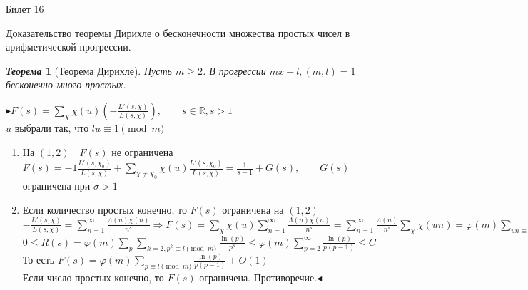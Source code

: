 \documentclass[a4paper,12pt]{article}
\newtheorem{teo}{\textit{Теорема}}
\newcommand{\ee}{\equiv}
\newcommand{\FI}{\varphi}
\newcommand{\q}{\quad}
\newcommand{\pb}{\blacktriangleright}
\newcommand{\pe}{\blacktriangleleft}
\newcommand{\Ra}{\Rightarrow}
\newcommand{\bb}[1]{\mathbb{#1}}
\newcommand{\SL}{\sum\limits}
\newcommand{\os}{\left(}
\newcommand{\cs}{\right)}
\begin{document}
\newpage
\begin{mybox2}{\hypertarget{bil16}{Билет 16}}

\begin{formbox}{}
Доказательство теоремы Дирихле о бесконечности множества простых чисел в арифметической прогрессии.
\end{formbox}
\begin{formbox}{}
\begin{teo}[Теорема Дирихле] Пусть $m\ge 2$. В прогрессии $mx+l, (m,l) = 1$ бесконечно много простых.
\end{teo}
\end{formbox}
$\pb F(s) = \SL_{\chi}\chi(u) \os -\frac{L'(s,\chi)}{L(s,\chi)}  \cs, \q\q s\in\bb{R}, s > 1 $\\
$u$ выбрали так, что $lu\ee 1\pmod{m}$\\
\begin{enumerate}
\item На $(1,2)\q F(s)$ не ограничена\\
$F(s) = -1 \frac{L'(s,\chi_0)}{L(s,\chi)} + \SL_{\chi\not=\chi_0} \chi(u) \frac{L'(s,\chi_0)}{L(s,\chi)}  = \frac{1}{s-1} + G(s),\q\q G(s) $ ограничена при $\sigma > 1$
\item Если количество простых конечно, то $F(s)$ ограничена на $(1,2)$\\
$-\frac{L'(s,\chi)}{L(s,\chi)} = \SL_{n=1}^\infty \frac{\Lambda(n)\chi(n)}{n^s}\Ra F(s) = \SL_{\chi} \chi(u) \SL_{n=1}^\infty \frac{\Lambda(n)\chi(n)}{n^s} = \SL_{n=1}^\infty \frac{\Lambda(n)}{n^s} \SL_\chi \chi(un) = \FI(m) \SL_{un\ee1\pmod{m}} \frac{\Lambda(n)}{n^s}  =  \FI(m) \SL_{n\ee l\pmod{m}} \frac{\Lambda(n)}{n^s} = \FI(m)\SL_{p\ee l\pmod{m}} \frac{\ln(p)}{p^s} + R(s)$\\
$0 \le R(s)  = \FI(m)\SL_{p}\SL_{k=2, p^k \ee l\pmod{m}}  \frac{\ln(p)}{p^s}\le \FI(m)  \SL_{p=2}^\infty \frac{\ln(p)}{p(p-1)} \le C $\\
То есть $F(s) = \FI(m) \SL_{p\ee l\pmod{m}} \frac{\ln(p)}{p(p-1)} + O(1) $\\
Если число простых конечно, то $F(s) $ ограничена. Противоречие.$\pe$
\end{enumerate}

\end{mybox2}
\end{document}
